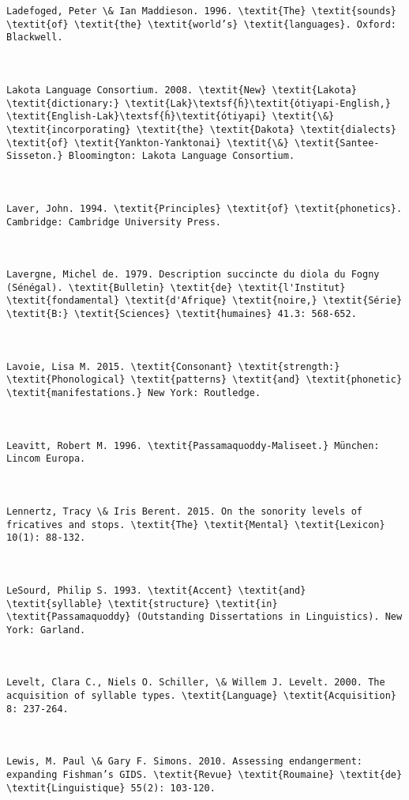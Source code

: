 \begin{verbatim}
Ladefoged, Peter \& Ian Maddieson. 1996. \textit{The} \textit{sounds} \textit{of} \textit{the} \textit{world’s} \textit{languages}. Oxford: Blackwell.



Lakota Language Consortium. 2008. \textit{New} \textit{Lakota} \textit{dictionary:} \textit{Lak}\textsf{ȟ}\textit{ótiyapi-English,} \textit{English-Lak}\textsf{ȟ}\textit{ótiyapi} \textit{\&} \textit{incorporating} \textit{the} \textit{Dakota} \textit{dialects} \textit{of} \textit{Yankton-Yanktonai} \textit{\&} \textit{Santee-Sisseton.} Bloomington: Lakota Language Consortium.



Laver, John. 1994. \textit{Principles} \textit{of} \textit{phonetics}. Cambridge: Cambridge University Press.



Lavergne, Michel de. 1979. Description succincte du diola du Fogny (Sénégal). \textit{Bulletin} \textit{de} \textit{l'Institut} \textit{fondamental} \textit{d'Afrique} \textit{noire,} \textit{Série} \textit{B:} \textit{Sciences} \textit{humaines} 41.3: 568-652.



Lavoie, Lisa M. 2015. \textit{Consonant} \textit{strength:} \textit{Phonological} \textit{patterns} \textit{and} \textit{phonetic} \textit{manifestations.} New York: Routledge.



Leavitt, Robert M. 1996. \textit{Passamaquoddy-Maliseet.} München: Lincom Europa.



Lennertz, Tracy \& Iris Berent. 2015. On the sonority levels of fricatives and stops. \textit{The} \textit{Mental} \textit{Lexicon} 10(1): 88-132.



LeSourd, Philip S. 1993. \textit{Accent} \textit{and} \textit{syllable} \textit{structure} \textit{in} \textit{Passamaquoddy} (Outstanding Dissertations in Linguistics). New York: Garland.



Levelt, Clara C., Niels O. Schiller, \& Willem J. Levelt. 2000. The acquisition of syllable types. \textit{Language} \textit{Acquisition} 8: 237-264.



Lewis, M. Paul \& Gary F. Simons. 2010. Assessing endangerment: expanding Fishman’s GIDS. \textit{Revue} \textit{Roumaine} \textit{de} \textit{Linguistique} 55(2): 103-120.




\end{verbatim}
